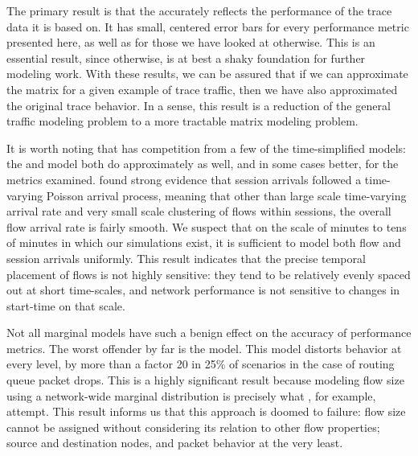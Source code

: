 \documentclass[twocolumn,final]{svjour3}
\begin{document}
The primary result is that the  accurately reflects the performance of the trace data it is based on. It has small, centered error bars for every performance metric presented here, as well as for those we have looked at otherwise. This is an essential result, since otherwise,  is at best a shaky foundation for further modeling work. With these results, we can be assured that if we can approximate the matrix for a given example of trace traffic, then we have also approximated the original trace behavior. In a sense, this result is a reduction of the general traffic modeling problem to a more tractable matrix modeling problem.

It is worth noting that  has competition from a few of the time-simplified models: the  and  model both do approximately as well, and in some cases better, for the metrics examined. {\FHC} found strong evidence that session arrivals followed a time-varying Poisson arrival process, meaning that other than large scale time-vary\-ing arrival rate and very small scale clustering of flows within sessions, the overall flow arrival rate is fairly smooth. We suspect that on the scale of minutes to tens of minutes in which our simulations exist, it is sufficient to model both flow and session arrivals uniformly. This result indicates that the precise temporal placement of flows is not highly sensitive: they tend to be relatively evenly spaced out at short time-scales, and network performance is not sensitive to changes in start-time on that scale.

Not all marginal models have such a benign effect on the accuracy of performance metrics. The worst offender by far is the  model. This model distorts behavior at every level, by more than a factor 20 in 25\% of scenarios in the case of routing queue packet drops. This is a highly significant result because modeling flow size using a network-wide marginal distribution is precisely what {\FHC}, for example, attempt. This result informs us that this approach is doomed to failure: flow size cannot be assigned without considering its relation to other flow properties; source and destination nodes, and packet behavior at the very least.
\end{document}
